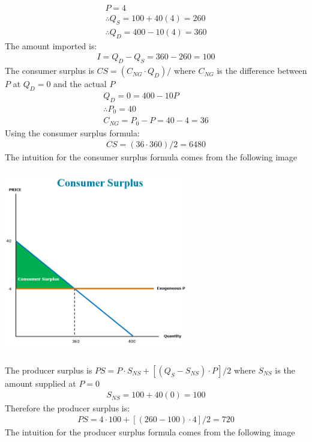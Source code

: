 \documentclass{article}
\begin{document}
\begin{gather*}
  P = 4 \\
  \therefore Q_{S} = 100 + 40(4) = 260 \\
  \therefore Q_{D} = 400 - 10(4) = 360
\end{gather*}
The amount imported is:
\begin{gather*}
  I = Q_{D} - Q_{S} = 360 - 260 = 100
\end{gather*}
The consumer surplus is $CS = (C_{NG} \cdot Q_{D})/$ where $C_{NG}$ is the difference between $P$ at $Q_{D}=0$ and the actual $P$
\begin{gather*}
  Q_{D} = 0 = 400 - 10P \\
  \therefore P_{0} = 40 \\
  C_{NG} = P_{0} - P = 40 - 4 = 36
\end{gather*}
Using the consumer surplus formula:
\begin{gather*}
  CS = (36 \cdot 360)/2 = 6480
\end{gather*}
The intuition for the consumer surplus formula comes from the following image \\
\begin{center}
  \includegraphics[width=8cm, height=8cm]{pic8}
\end{center}
The producer surplus is $PS = P \cdot S_{NS} + [(Q_{S} - S_{NS}) \cdot P]/2$ where $S_{NS}$ is the amount supplied at $P=0$
\begin{gather*}
  S_{NS} = 100 + 40(0) = 100
\end{gather*}
Therefore the producer surplus is:
\begin{gather*}
  PS = 4 \cdot 100 + [(260-100) \cdot 4]/2 = 720
\end{gather*}
The intuition for the producer surplus formula comes from the following image \\
\end{document}

